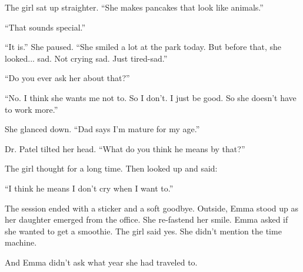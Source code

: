 The girl sat up straighter. ``She makes pancakes that look like animals.''

``That sounds special.''

``It is.'' She paused. ``She smiled a lot at the park today. But before that, she looked... sad. 
Not crying sad. Just tired-sad.''

``Do you ever ask her about that?''

``No. I think she wants me not to. So I don’t. I just be good. So she doesn’t have to work more.''  

She glanced down. ``Dad says I’m mature for my age.''

Dr. Patel tilted her head. ``What do you think he means by that?''

The girl thought for a long time. Then looked up and said:

``I think he means I don’t cry when I want to.''

The session ended with a sticker and a soft goodbye. 
Outside, Emma stood up as her daughter emerged from the office.
She re-fastend her smile. 
Emma asked if she wanted to get a smoothie. 
The girl said yes. 
She didn’t mention the time machine.

And Emma didn’t ask what year she had traveled to.

\medskip

